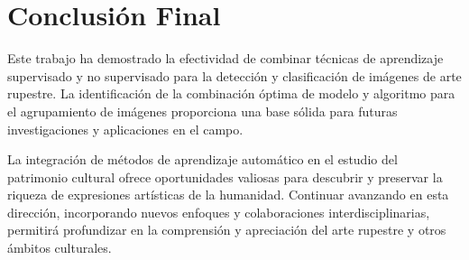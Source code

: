 \section{Conclusión Final}

Este trabajo ha demostrado la efectividad de combinar técnicas de aprendizaje supervisado y no supervisado para la detección y clasificación de imágenes de arte rupestre. La identificación de la combinación óptima de modelo y algoritmo para el agrupamiento de imágenes proporciona una base sólida para futuras investigaciones y aplicaciones en el campo.

La integración de métodos de aprendizaje automático en el estudio del patrimonio cultural ofrece oportunidades valiosas para descubrir y preservar la riqueza de expresiones artísticas de la humanidad. Continuar avanzando en esta dirección, incorporando nuevos enfoques y colaboraciones interdisciplinarias, permitirá profundizar en la comprensión y apreciación del arte rupestre y otros ámbitos culturales.